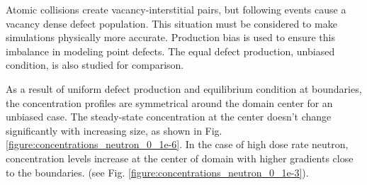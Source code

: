 \documentclass[a4paper]{article}
\begin{document}
    Atomic collisions create vacancy-interstitial pairs, but following events cause a vacancy dense defect population. This situation must be considered to make simulations physically more accurate. Production bias is used to ensure this imbalance in modeling point defects. The equal defect production, unbiased condition, is also studied for comparison.

    As a result of uniform defect production and equilibrium condition at boundaries, the concentration profiles are symmetrical around the domain center for an unbiased case. The steady-state concentration at the center doesn't change significantly with increasing size, as shown in Fig. \ref{figure:concentrations_neutron_0_1e-6}. In the case of high dose rate neutron, concentration levels increase at the center of domain with higher gradients close to the boundaries. (see Fig. \ref{figure:concentrations_neutron_0_1e-3}).\\
\end{document}
